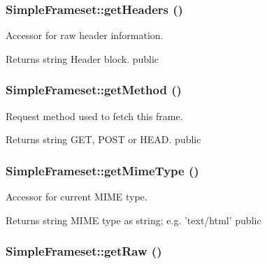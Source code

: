 \hypertarget{class_simple_frameset_a9491ea8656bb9c9beec2cb9a25caa5bb}{
\subsubsection[{getHeaders}]{\setlength{\rightskip}{0pt plus 5cm}SimpleFrameset::getHeaders ()}}
\label{class_simple_frameset_a9491ea8656bb9c9beec2cb9a25caa5bb}
Accessor for raw header information. \begin{DoxyReturn}{Returns}
string Header block.  public 
\end{DoxyReturn}
\hypertarget{class_simple_frameset_a96a168b9b6dd9d68996a7d818a64df8c}{
\subsubsection[{getMethod}]{\setlength{\rightskip}{0pt plus 5cm}SimpleFrameset::getMethod ()}}
\label{class_simple_frameset_a96a168b9b6dd9d68996a7d818a64df8c}
Request method used to fetch this frame. \begin{DoxyReturn}{Returns}
string GET, POST or HEAD.  public 
\end{DoxyReturn}
\hypertarget{class_simple_frameset_a2a0af45fe11ccdf1f5d575c903550939}{
\subsubsection[{getMimeType}]{\setlength{\rightskip}{0pt plus 5cm}SimpleFrameset::getMimeType ()}}
\label{class_simple_frameset_a2a0af45fe11ccdf1f5d575c903550939}
Accessor for current MIME type. \begin{DoxyReturn}{Returns}
string MIME type as string; e.g. 'text/html'  public 
\end{DoxyReturn}
\hypertarget{class_simple_frameset_af34beb82a412aafcbd92be1fed290e07}{
\subsubsection[{getRaw}]{\setlength{\rightskip}{0pt plus 5cm}SimpleFrameset::getRaw ()}}
\label{class_simple_frameset_af34beb82a412aafcbd92be1fed290e07}
